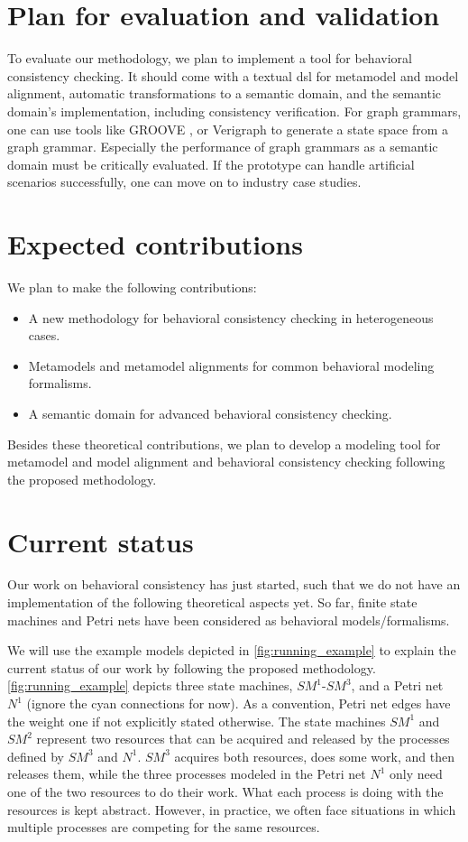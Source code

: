 \documentclass[conference]{IEEEtran}
\begin{document}
\section{Plan for evaluation and validation}
To evaluate our methodology, we plan to implement a tool for behavioral consistency checking.
It should come with a textual \gls{dsl} for metamodel and model alignment, automatic transformations to a semantic domain, and the semantic domain's implementation, including consistency verification.
For graph grammars, one can use tools like GROOVE \cite{ghamarianModellingAnalysisUsing2012, rensinkGROOVESimulatorTool2004}, or Verigraph \cite{costaVerigraphSystemSpecification2016} to generate a state space from a graph grammar.
Especially the performance of graph grammars as a semantic domain must be critically evaluated.
If the prototype can handle artificial scenarios successfully, one can move on to industry case studies.

\section{Expected contributions}
We plan to make the following contributions:
\begin{itemize}
    \item A new methodology for behavioral consistency checking in heterogeneous cases.
    \item Metamodels and metamodel alignments for common behavioral modeling formalisms.
    \item A semantic domain for advanced behavioral consistency checking.
\end{itemize}
Besides these theoretical contributions, we plan to develop a modeling tool for metamodel and model alignment and behavioral consistency checking following the proposed methodology.

\section{Current status} \label{sec:currentStatus}
Our work on behavioral consistency has just started, such that we do not have an implementation of the following theoretical aspects yet.
So far, finite state machines and Petri nets have been considered as behavioral models/formalisms.

We will use the example models depicted in \autoref{fig:running_example} to explain the current status of our work by following the proposed methodology.
\autoref{fig:running_example} depicts three state machines, $SM^1$-$SM^3$, and a Petri net $N^1$ (ignore the cyan connections for now).
As a convention, Petri net edges have the weight one if not explicitly stated otherwise.
The state machines $SM^1$ and $SM^2$ represent two resources that can be acquired and released by the processes defined by $SM^3$ and $N^1$.
$SM^3$ acquires both resources, does some work, and then releases them, while the three processes modeled in the Petri net $N^1$ only need one of the two resources to do their work.
What each process is doing with the resources is kept abstract.
However, in practice, we often face situations in which multiple processes are competing for the same resources.
\end{document}
